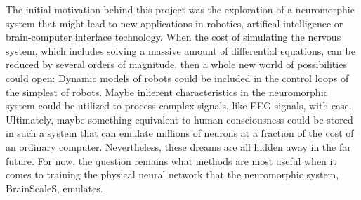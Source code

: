 The initial motivation behind this project was the exploration of a neuromorphic system that might lead to new applications in robotics, artifical intelligence or brain-computer interface technology.
When the cost of simulating the nervous system, which includes solving a massive amount of differential equations, can be reduced by several orders of magnitude, then a whole new world of possibilities could open:
Dynamic models of robots could be included in the control loops of the simplest of robots.
Maybe inherent characteristics in the neuromorphic system could be utilized to process complex signals, like EEG signals, with ease.
Ultimately, maybe something equivalent to human consciousness could be stored in such a system that can emulate millions of neurons at a fraction of the cost of an ordinary computer.
Nevertheless, these dreams are all hidden away in the far future.
For now, the question remains what methods are most useful when it comes to training the physical neural network that the neuromorphic system, BrainScaleS, emulates.
